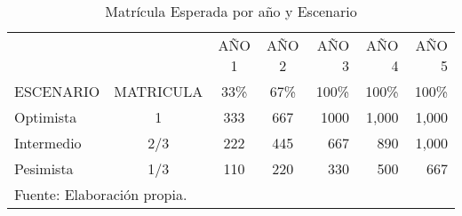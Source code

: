 \begin{table}[h]
    \centering
    \caption{Matrícula Esperada por año y Escenario}
    \label{tbl:MatriculaEsperada}
    \begin{tabular}{l|c|c|c|r|r|r}
                   &           & AÑO 1 & AÑO 2 & AÑO 3  & AÑO 4  & AÑO 5 \\
        ESCENARIO  & MATRICULA & 33\%  & 67\%  & 100\%  & 100\%  & 100\% \\
        \hline                                                  
        \hline                                                  
        Optimista  & 1         & 333   & 667   & 1000   & 1,000  & 1,000  \\
        Intermedio & 2/3       & 222   & 445   & 667    & 890    & 1,000  \\
        Pesimista  & 1/3       & 110   & 220   & 330    & 500    & 667    \\
        \hline
        \multicolumn{7}{l}{\footnotesize Fuente: Elaboración propia.}
    \end{tabular}
\end{table}


